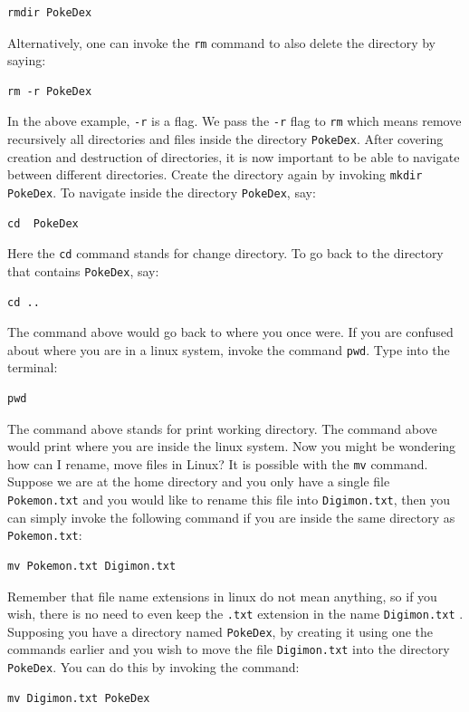 \documentclass[a4paper, 12pt]{report}
\begin{document}
\begin{center}
\begin{lstlisting}
rmdir PokeDex
\end{lstlisting}
Alternatively, one can invoke the \texttt{rm} command to also delete the directory by saying:
\begin{lstlisting}
rm -r PokeDex
\end{lstlisting}
In the above example, \texttt{-r} is a flag. We pass the \texttt{-r} flag to \texttt{rm} which means remove recursively all directories and files inside the directory \texttt{PokeDex}. After covering creation and destruction of directories, it is now important to be able to navigate between different directories. Create the directory again by invoking \texttt{mkdir PokeDex}. To navigate inside the directory \texttt{PokeDex}, say:
\begin{lstlisting}
cd  PokeDex
\end{lstlisting}
Here the \texttt{cd} command stands for change directory. To go back to the directory that contains \texttt{PokeDex}, say:
\begin{lstlisting}
cd ..
\end{lstlisting}
The command above would go back to where you once were. If you are confused about where you are in a linux system, invoke the command \texttt{pwd}. Type into the terminal:
\begin{lstlisting}
pwd
\end{lstlisting}
The command above stands for print working directory. The command above would print where you are inside the linux system. Now you might be wondering how can I rename, move files in Linux? It is possible with the \texttt{mv} command. Suppose we are at the home directory and you only have a single file \texttt{Pokemon.txt} and you would like to rename this file into \texttt{Digimon.txt}, then you can simply invoke the following command if you are inside the same directory as \texttt{Pokemon.txt}:
\begin{lstlisting}
mv Pokemon.txt Digimon.txt
\end{lstlisting}
Remember that file name extensions in linux do not mean anything, so if you wish, there is no need to even keep the \texttt{.txt} extension in the name \texttt{Digimon.txt} . Supposing you have a directory named \texttt{PokeDex}, by creating it using one the commands earlier and you wish to move the file \texttt{Digimon.txt} into the directory \texttt{PokeDex}. You can do this by invoking the command:
\begin{lstlisting}
mv Digimon.txt PokeDex
\end{lstlisting}

\end{center}
\end{document}
